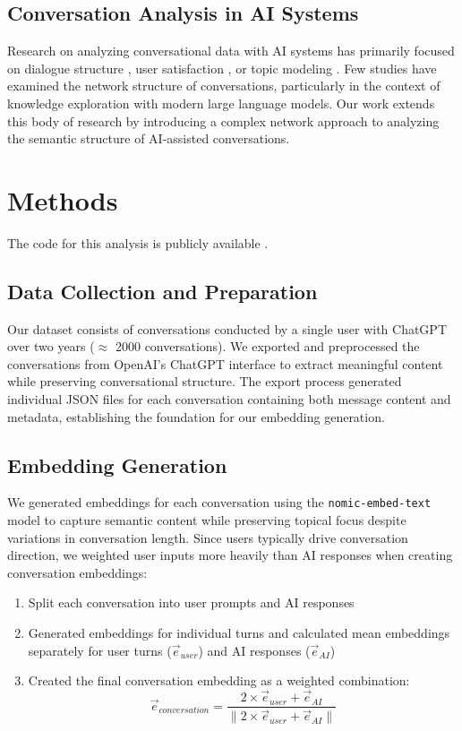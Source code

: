 \documentclass{svproc}
\begin{document}
\subsection{Conversation Analysis in AI Systems}

Research on analyzing conversational data with AI systems has primarily focused on dialogue structure \cite{serban2016}, user satisfaction \cite{venkatesh2018}, or topic modeling \cite{zeng2019}. Few studies have examined the network structure of conversations, particularly in the context of knowledge exploration with modern large language models. Our work extends this body of research by introducing a complex network approach to analyzing the semantic structure of AI-assisted conversations.


\section{Methods}

The code for this analysis is publicly available \cite{chatgpt-complex-net}.

\subsection{Data Collection and Preparation}

Our dataset consists of conversations conducted by a single user with ChatGPT over two years ($\approx$ 2000 conversations). We exported and preprocessed the conversations from OpenAI's ChatGPT interface to extract meaningful content while preserving conversational structure. The export process generated individual JSON files for each conversation containing both message content and metadata, establishing the foundation for our embedding generation.

\subsection{Embedding Generation}

We generated embeddings for each conversation using the \texttt{nomic-embed-text} \cite{nomicembed} model to capture semantic content while preserving topical focus despite variations in conversation length. Since users typically drive conversation direction, we weighted user inputs more heavily than AI responses when creating conversation embeddings:

\begin{enumerate}
    \item Split each conversation into user prompts and AI responses
    \item Generated embeddings for individual turns and calculated mean embeddings separately for user turns ($\vec{e}_{user}$) and AI responses ($\vec{e}_{AI}$)
    \item Created the final conversation embedding as a weighted combination:
    \begin{equation}
    \vec{e}_{conversation} = \frac{2 \times \vec{e}_{user} + \vec{e}_{AI}}{\|2 \times \vec{e}_{user} + \vec{e}_{AI}\|}
    \end{equation}
\end{enumerate}
\end{document}
